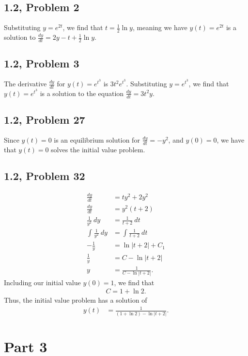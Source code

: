 \documentclass[10pt]{mypackage}
\begin{document}
\subsection{1.2, Problem 2}%
Substituting $y=e^{2t}$, we find that $t = \frac{1}{2}\ln y$, meaning we have $y(t) = e^{2t}$ is a solution to $\frac{dy}{dt} = 2y - t + \frac{1}{2}\ln y$.
\subsection{1.2, Problem 3}%
The derivative $\frac{dy}{dt}$ for $y(t) = e^{t^3}$ is $3t^2 e^{t^3}$. Substituting $y = e^{t^3}$, we find that $y(t) = e^{t^3}$ is a solution to the equation $\frac{dy}{dt} = 3t^2y$.
\subsection{1.2, Problem 27}%
Since $y(t) = 0$ is an equilibrium solution for $\frac{dy}{dt} = -y^2$, and $y(0) = 0$, we have that $y(t) = 0$ solves the initial value problem.
\subsection{1.2, Problem 32}%
\begin{align*}
  \frac{dy}{dt} &= ty^2 + 2y^2\\
  \frac{dy}{dt} &= y^2\left(t+2\right)\\
  \frac{1}{y^2}\:dy &= \frac{1}{t+2}\:dt\\
  \int_{}^{} \frac{1}{y^2}\:dy &= \int_{}^{} \frac{1}{t+2}\:dt\\
  -\frac{1}{y} &= \ln\left\vert t+2 \right\vert + C_1\\
  \frac{1}{y} &= C  - \ln \left\vert t+2 \right\vert\\
  y &= \frac{1}{C - \ln \left\vert t+2 \right\vert}.
\end{align*}
Including our initial value $y(0) = 1$, we find that
\begin{align*}
  C = 1 + \ln 2.
\end{align*}
Thus, the initial value problem has a solution of
\begin{align*}
  y(t) &= \frac{1}{\left(1 + \ln 2\right) - \ln \left\vert t+2 \right\vert}.
\end{align*}
\section{Part 3}%
\end{document}
